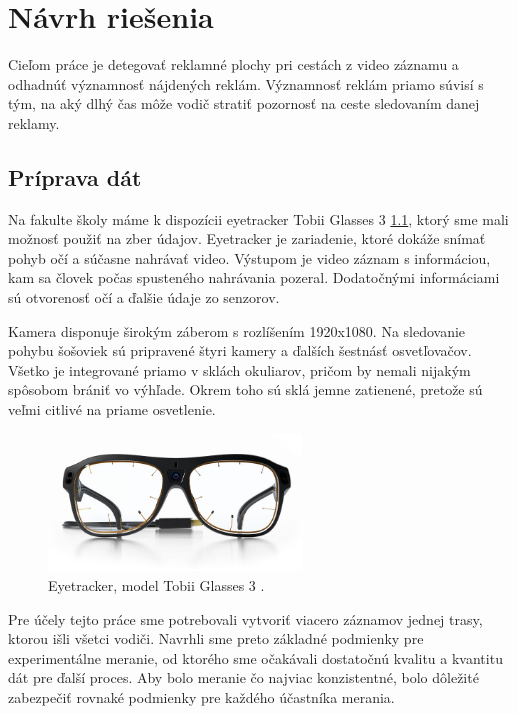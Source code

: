 \chapter{Návrh riešenia}\label{chap:proposal}

Cieľom práce je detegovať reklamné plochy pri cestách z video záznamu a odhadnúť významnosť nájdených reklám. Významnosť reklám priamo súvisí s tým, na aký dlhý čas môže vodič stratiť pozornosť na ceste sledovaním danej reklamy.

\section{Príprava dát}

Na fakulte školy máme k dispozícii eyetracker Tobii Glasses 3 \ref{img:tobii}, ktorý sme mali možnosť použiť na zber údajov. Eyetracker je zariadenie, ktoré dokáže snímať pohyb očí a súčasne nahrávať video. Výstupom je video záznam s informáciou, kam sa človek počas spusteného nahrávania pozeral. Dodatočnými informáciami sú otvorenosť očí a ďalšie údaje zo senzorov.

Kamera disponuje širokým záberom s rozlíšením 1920x1080. Na sledovanie pohybu šošoviek sú pripravené štyri kamery a ďalších šestnásť osvetľovačov. Všetko je integrované priamo v sklách okuliarov, pričom by nemali nijakým spôsobom brániť vo výhľade. Okrem toho sú sklá jemne zatienené, pretože sú veľmi citlivé na priame osvetlenie.


\begin{figure}[ht]
    \centering
    \includegraphics[width=0.6\textwidth]{images/02/glasses.jpg}
    \caption{Eyetracker, model Tobii Glasses 3 \cite{tobii}.}
    \label{img:tobii}
\end{figure}

Pre účely tejto práce sme potrebovali vytvoriť viacero záznamov jednej trasy, ktorou išli všetci vodiči. Navrhli sme preto základné podmienky pre experimentálne meranie, od ktorého sme očakávali dostatočnú kvalitu a kvantitu dát pre ďalší proces. Aby bolo meranie čo najviac konzistentné, bolo dôležité zabezpečiť rovnaké podmienky pre každého účastníka merania. 

